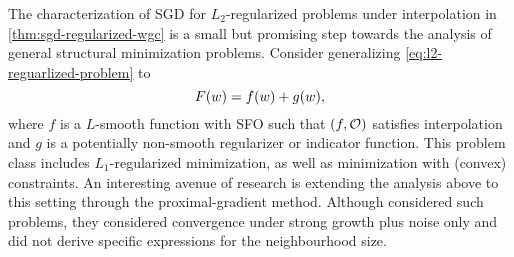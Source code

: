 The characterization of \ac{SGD} for \( L_2 \)-regularized problems  under interpolation in \autoref{thm:sgd-regularized-wgc} is a small but promising step towards the analysis of general structural minimization problems.
Consider generalizing \autoref{eq:l2-reguarlized-problem} to 
\[ F(\w) = f(\w) + g(\w), \]
where \( f \) is a \( L \)-smooth function with \ac{SFO} \oracle{} such that \( \rbr{f, \oracle{}} \) satisfies interpolation and \( g \) is a potentially non-smooth regularizer or indicator function. 
This problem class includes \( L_1 \)-regularized minimization, as well as minimization with (convex) constraints.
An interesting avenue of research is extending the analysis above to this setting through the proximal-gradient method.
Although \citet{cevher2018linear} considered such problems, they considered convergence under strong growth plus noise only and did not derive specific expressions for the neighbourhood size.

